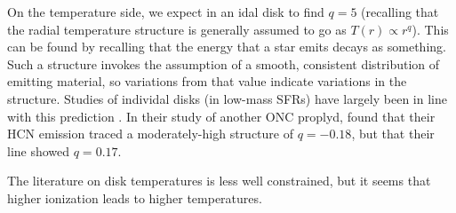 







On the temperature side, we expect in an idal disk to find $q=5$ (recalling that the radial temperature structure is generally assumed to go as $T(r) \propto r^{q}$). This can be found by recalling that the energy that a star emits decays as something. Such a structure invokes the assumption of a smooth, consistent distribution of emitting material, so variations from that value indicate variations in the structure. Studies of individal disks (in low-mass SFRs) have largely been in line with this prediction \citep[e.g. ][, whose values range from -0.22 to -0.7]{Dartois2003,Panic2008,Panic2010,Hughes2008,Qi2003,Qi2004,Isella2007,Rosenfeld2012,Flaherty2015,Flaherty2017,Zhang2017,Flaherty2018}. In their study of another ONC proplyd, \citet{Factor2017} found that their HCN emission traced a moderately-high structure of $q=-0.18$, but that their \hco line showed $q=0.17$.


The literature on disk temperatures is less well constrained, but it seems that higher ionization leads to higher temperatures.





